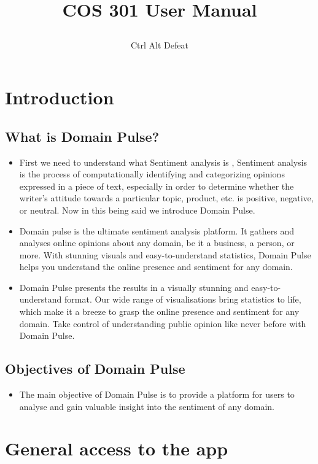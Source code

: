 \documentclass[12pt]{article}
\title{

\\
{COS 301 User Manual}
}
\author{Ctrl Alt Defeat}
\begin{document}


\tableofcontents

\newpage



\section{Introduction}
\subsection{What is Domain Pulse?}
\begin{itemize}
    \item First we need to understand what Sentiment analysis is , Sentiment analysis is the process of computationally identifying and categorizing opinions expressed in a piece of text, especially in order to determine whether the writer's attitude towards a particular topic, product, etc. is positive, negative, or neutral. Now in this being said we introduce Domain Pulse.
    \item Domain pulse is the ultimate sentiment analysis platform. It gathers and analyses online opinions about any domain, be it a business, a person, or more. With stunning visuals and easy-to-understand statistics, Domain Pulse helps you understand the online presence and sentiment for any domain.
    \item Domain Pulse presents the results in a visually stunning and easy-to-understand
    format. Our wide range of visualisations bring statistics to life, which make it a breeze
    to grasp the online presence and sentiment for any domain. Take control of
    understanding public opinion like never before with Domain Pulse.
\end{itemize}
\subsection{Objectives of Domain Pulse}
\begin{itemize}
    \item The main objective of Domain Pulse is to provide a platform for users to analyse and gain valuable insight into the sentiment of any domain.
\end{itemize}
\newpage
\section{General access to the app}
\end{document}
